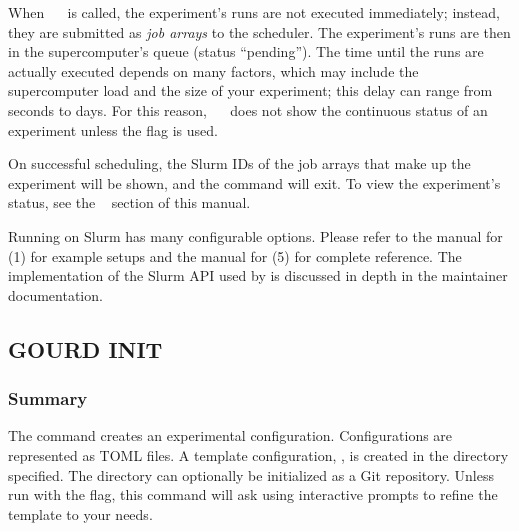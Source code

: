 \documentclass[a4paper,english]{article}
\begin{document}
\begin{adjustwidth}{18pt}{0pt}
\begin{Description}[Subcommands]
                        When ~~ is called, the experiment's runs
                        are not executed immediately; instead, they are submitted as \emph{job arrays}
                        to the  scheduler.
                        The experiment's runs are then in the supercomputer's queue (status ``pending'').
                        The time until the runs are actually executed depends on many factors, which
                        may include the supercomputer load and the size of your experiment; this
                        delay can range from seconds to days.
                        For this reason, ~~ does not show the
                        continuous status of an experiment unless the  flag is
                        used.

                        On successful scheduling, the Slurm IDs of the job arrays that make
                        up the experiment will be shown, and the command will exit.
                        To view the experiment's status, see the ~ section
                        of this manual.

                        Running on Slurm has many configurable options.
                        Please refer to the manual for (1) for example setups
                        and the manual for (5) for complete reference.
                        The implementation of the Slurm API used by  is discussed
                        in depth in the  maintainer documentation.
                \end{Description}


        \subsection{GOURD INIT}

            \subsubsection{Summary}
                The   command creates an experimental configuration.
                Configurations are represented as TOML files.
                A template configuration, , is created in the directory specified.
                The directory can optionally be initialized as a Git repository.
                Unless run with the  flag, this command will ask using interactive prompts
                to refine the template to your needs.


\end{adjustwidth}
\end{document}
